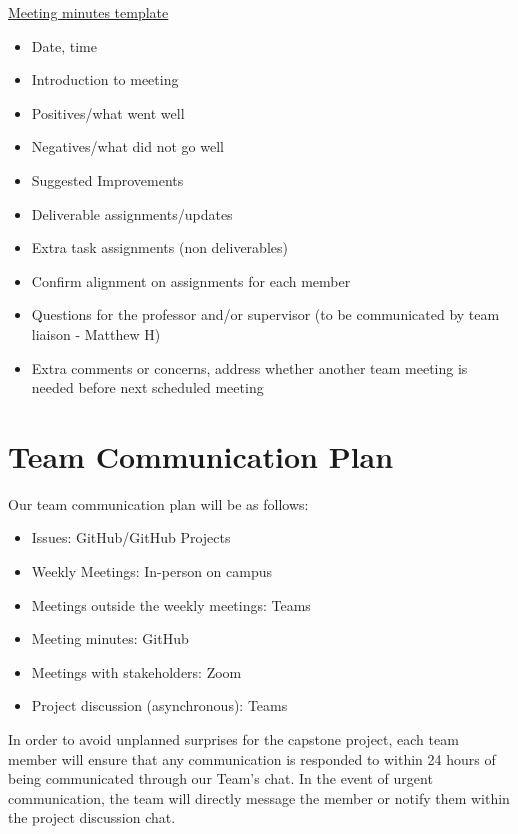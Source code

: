 \documentclass{article}
\begin{document}
\underline{Meeting minutes template}

\begin{itshape}
  \begin{flushleft}
    \begin{itemize}
      \item Date, time   
      \item Introduction to meeting  
      \item Positives/what went well
      \item Negatives/what did not go well
      \item Suggested Improvements 
      \item Deliverable assignments/updates
      \item Extra task assignments (non deliverables)
      \item Confirm alignment on assignments for each member
      \item Questions for the professor and/or supervisor (to be communicated by team liaison - Matthew H)
      \item Extra comments or concerns, address whether another team meeting is needed before next scheduled meeting
      
     \end{itemize}

  \end{flushleft}
\end{itshape}




\section{Team Communication Plan}

Our team communication plan will be as follows:
\begin{itemize}
  \item Issues: GitHub/GitHub Projects
  \item Weekly Meetings: In-person on campus
  \item Meetings outside the weekly meetings: Teams
  \item Meeting minutes: GitHub
  \item Meetings with stakeholders: Zoom
  \item Project discussion (asynchronous): Teams
\end{itemize}


In order to avoid unplanned surprises for the capstone project, each team member will ensure that any communication is responded to within 24 hours of being communicated through our Team's chat. In the event of urgent communication, the team will directly message the member or notify them within the project discussion chat.
\end{document}
